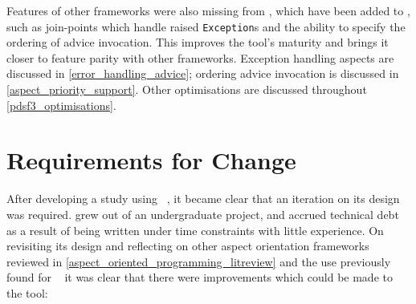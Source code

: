 Features of other \aop{} frameworks were also missing from \pydysofu{}, which
have been added to \pdsfthree{}, such as join-points which handle raised
\lstinline{Exception}s and the ability to specify the ordering of advice
invocation. This improves the tool's maturity and brings it closer to feature
parity with other \aop{} frameworks. Exception handling aspects are discussed in
\cref{error_handling_advice}; ordering advice invocation is discussed in
\cref{aspect_priority_support}. Other optimisations are discussed throughout
\cref{pdsf3_optimisations}.








\section{Requirements for Change}\label{sec:pdsf3requirements}

After developing a study using \pydysofu{}~\cite{wallis2018caise}, it became clear that an iteration on its
design was required. \pydysofu{} grew out of an undergraduate project, and accrued
technical debt as a result of being written under time constraints with little
experience. On revisiting its design and reflecting on other aspect orientation
frameworks reviewed in  
\cref{aspect_oriented_programming_litreview} and the use previously found for
\pydysofu{}~\cite{wallis2018caise,wallis2018genetic} it was clear that there were
improvements which could be made to the tool:

